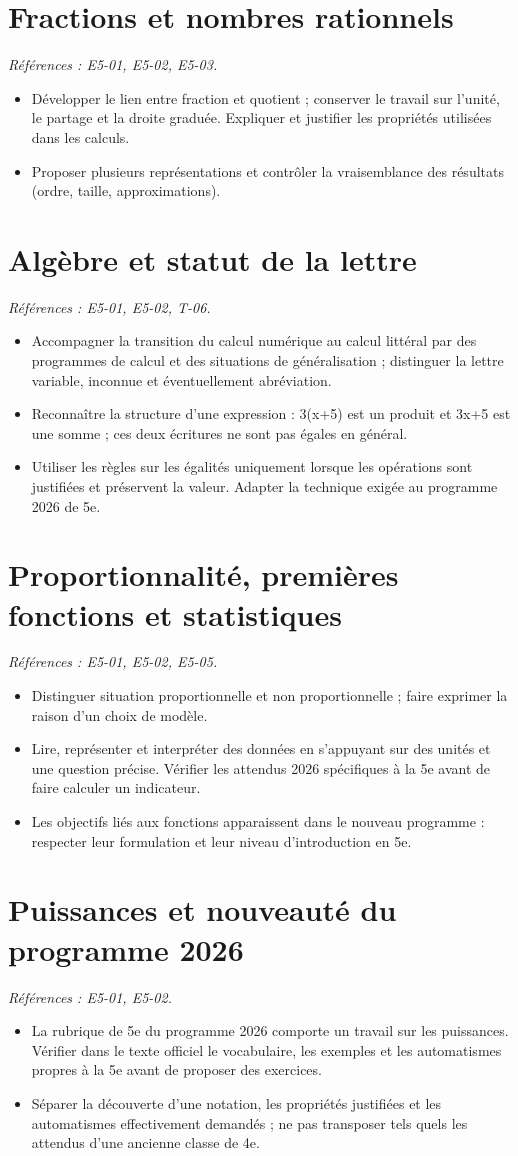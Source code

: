 \documentclass[11pt,a4paper]{article}
\newcommand{\sectionref}[2]{\section{#1}\textit{Références : #2.}\par}
\begin{document}
\sectionref{Fractions et nombres rationnels}{E5-01, E5-02, E5-03}
\begin{itemize}
\item Développer le lien entre fraction et quotient ; conserver le travail sur l’unité, le partage et la droite graduée. Expliquer et justifier les propriétés utilisées dans les calculs.
\item Proposer plusieurs représentations et contrôler la vraisemblance des résultats (ordre, taille, approximations).
\end{itemize}
\sectionref{Algèbre et statut de la lettre}{E5-01, E5-02, T-06}
\begin{itemize}
\item Accompagner la transition du calcul numérique au calcul littéral par des programmes de calcul et des situations de généralisation ; distinguer la lettre variable, inconnue et éventuellement abréviation.
\item Reconnaître la structure d’une expression : 3(x+5) est un produit et 3x+5 est une somme ; ces deux écritures ne sont pas égales en général.
\item Utiliser les règles sur les égalités uniquement lorsque les opérations sont justifiées et préservent la valeur. Adapter la technique exigée au programme 2026 de 5e.
\end{itemize}
\sectionref{Proportionnalité, premières fonctions et statistiques}{E5-01, E5-02, E5-05}
\begin{itemize}
\item Distinguer situation proportionnelle et non proportionnelle ; faire exprimer la raison d’un choix de modèle.
\item Lire, représenter et interpréter des données en s’appuyant sur des unités et une question précise. Vérifier les attendus 2026 spécifiques à la 5e avant de faire calculer un indicateur.
\item Les objectifs liés aux fonctions apparaissent dans le nouveau programme : respecter leur formulation et leur niveau d’introduction en 5e.
\end{itemize}
\sectionref{Puissances et nouveauté du programme 2026}{E5-01, E5-02}
\begin{itemize}
\item La rubrique de 5e du programme 2026 comporte un travail sur les puissances. Vérifier dans le texte officiel le vocabulaire, les exemples et les automatismes propres à la 5e avant de proposer des exercices.
\item Séparer la découverte d'une notation, les propriétés justifiées et les automatismes effectivement demandés ; ne pas transposer tels quels les attendus d'une ancienne classe de 4e.
\end{itemize}
\end{document}
